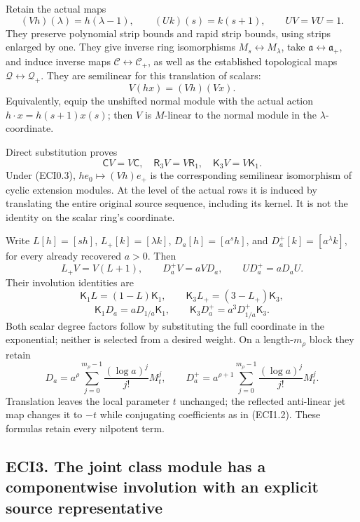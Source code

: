 Retain the actual maps \[
(Vh)(\lambda)=h(\lambda-1),\qquad
(Uk)(s)=k(s+1),\qquad UV=VU=1.
\tag{ECI2.1}
\] They preserve polynomial strip bounds and rapid strip bounds, using
strips enlarged by one. They give inverse ring isomorphisms
\(M_s\leftrightarrow M_\lambda\), take
\(\mathfrak a\leftrightarrow\mathfrak a_+\), and induce inverse maps
\(\mathscr C\leftrightarrow\mathscr C_+\), as well as the established
topological maps \(\mathcal Q\leftrightarrow\mathcal Q_+\). They are
semilinear for this translation of scalars: \[
V(hx)=(Vh)(Vx).
\tag{ECI2.2}
\] Equivalently, equip the unshifted normal module with the actual
action \(h\cdot x=h(s+1)x(s)\); then \(V\) is \(M\)-linear to the normal
module in the \(\lambda\)-coordinate.

Direct substitution proves \[
\mathsf C V=V\mathsf C,
\quad\mathsf R_3V=V\mathsf R_1,
\quad\mathsf K_3V=V\mathsf K_1.
\tag{ECI2.3}
\] Under (ECI0.3), \(h e_0\mapsto(Vh)e_+\) is the corresponding
semilinear isomorphism of cyclic extension modules. At the level of the
actual rows it is induced by translating the entire original source
sequence, including its kernel. It is not the identity on the scalar
ring's coordinate.

Write \(L[h]=[sh]\), \(L_+[k]=[\lambda k]\), \(D_a[h]=[a^s h]\), and
\(D_a^+[k]=[a^\lambda k]\), for every already recovered \(a>0\). Then \[
L_+V=V(L+1),\qquad
D_a^+V=aVD_a,\qquad
UD_a^+=aD_aU.
\tag{ECI2.4}
\] Their involution identities are \[
\mathsf K_1L=(1-L)\mathsf K_1,
\qquad\mathsf K_3L_+=(3-L_+)\mathsf K_3,
\] \[
\boxed{\mathsf K_1D_a=aD_{1/a}\mathsf K_1,
\qquad\mathsf K_3D_a^+=a^3D_{1/a}^+\mathsf K_3.}
\tag{ECI2.5}
\] Both scalar degree factors follow by substituting the full coordinate
in the exponential; neither is selected from a desired weight. On a
length-\(m_\rho\) block they retain \[
D_a=a^\rho\sum_{j=0}^{m_\rho-1}
\frac{(\log a)^j}{j!}M_t^j,
\qquad
D_a^+=a^{\rho+1}\sum_{j=0}^{m_\rho-1}
\frac{(\log a)^j}{j!}M_t^j.
\tag{ECI2.6}
\] Translation leaves the local parameter \(t\) unchanged; the reflected
anti-linear jet map changes it to \(-t\) while conjugating coefficients
as in (ECI1.2). These formulas retain every nilpotent term.

\subsection{ECI3. The joint class module has a componentwise involution
with an explicit source
representative}\label{eci3.-the-joint-class-module-has-a-componentwise-involution-with-an-explicit-source-representative}

